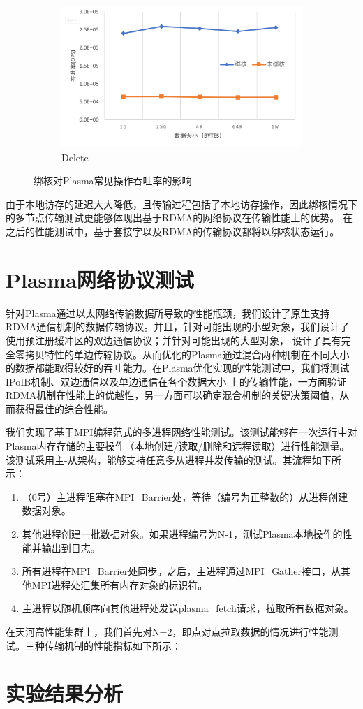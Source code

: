 \begin{figure}[h]
	\\
	\centering
    \begin{subfigure}{0.5\textwidth}
        \includegraphics[width=\textwidth]{image/chap04/del.png}
        \caption{Delete}
    \end{subfigure}
    \caption{绑核对Plasma常见操作吞吐率的影响}
    \label{fig:numa}
\end{figure}

由于本地访存的延迟大大降低，且传输过程包括了本地访存操作，因此绑核情况下的多节点传输测试更能够体现出基于RDMA的网络协议在传输性能上的优势。
在之后的性能测试中，基于套接字以及RDMA的传输协议都将以绑核状态运行。

\section{Plasma网络协议测试}

针对Plasma通过以太网络传输数据所导致的性能瓶颈，我们设计了原生支持RDMA通信机制的数据传输协议。并且，针对可能出现的小型对象，我们设计了使用预注册缓冲区的双边通信协议；并针对可能出现的大型对象，
设计了具有完全零拷贝特性的单边传输协议。从而优化的Plasma通过混合两种机制在不同大小的数据都能取得较好的吞吐能力。在Plasma优化实现的性能测试中，我们将测试IPoIB机制、双边通信以及单边通信在各个数据大小
上的传输性能，一方面验证RDMA机制在性能上的优越性，另一方面可以确定混合机制的关键决策阈值，从而获得最佳的综合性能。

我们实现了基于MPI编程范式的多进程网络性能测试。该测试能够在一次运行中对Plasma内存存储的主要操作（本地创建/读取/删除和远程读取）进行性能测量。
该测试采用主-从架构，能够支持任意多从进程并发传输的测试。其流程如下所示：

\begin{enumerate}
	\item （0号）主进程阻塞在MPI\_Barrier处，等待（编号为正整数的）从进程创建数据对象。
	\item 其他进程创建一批数据对象。如果进程编号为N-1，测试Plasma本地操作的性能并输出到日志。
	\item 所有进程在MPI\_Barrier处同步。之后，主进程通过MPI\_Gather接口，从其他MPI进程处汇集所有内存对象的标识符。
	\item 主进程以随机顺序向其他进程处发送plasma\_fetch请求，拉取所有数据对象。
\end{enumerate}

在天河高性能集群上，我们首先对N=2，即点对点拉取数据的情况进行性能测试。三种传输机制的性能指标如下所示：

\section{实验结果分析}